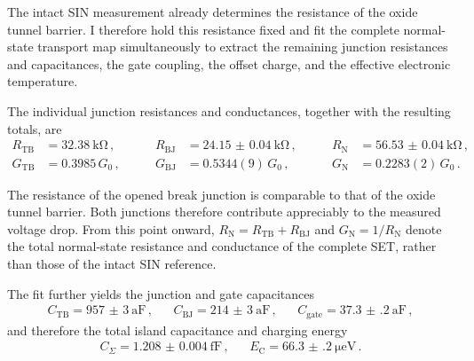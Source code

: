             The intact SIN measurement already determines the resistance of the oxide tunnel barrier. I therefore hold this resistance fixed and fit the complete normal-state transport map simultaneously to extract the remaining junction resistances and capacitances, the gate coupling, the offset charge, and the effective electronic temperature.
            
            The individual junction resistances and conductances, together with the resulting totals, are
            \begin{equation}
                \begin{alignedat}{3}
                    R_\mathrm{TB} &= \qty{32.38}{\kilo\ohm}\,, &\qquad
                    R_\mathrm{BJ} &= \qty{24.15(4)}{\kilo\ohm}\,, &\qquad
                    R_\mathrm{N}  &= \qty{56.53(4)}{\kilo\ohm}\,, \\
                    G_\mathrm{TB} &= 0.3985\,G_0\,, &\qquad
                    G_\mathrm{BJ} &= 0.5344(9)\,G_0\,, &\qquad
                    G_\mathrm{N}  &= 0.2283(2)\,G_0\,. 
                \end{alignedat}
                \label{eq:ssn-set:static:nset-resistance}
            \end{equation}

            The resistance of the opened break junction is comparable to that of the oxide tunnel barrier. Both junctions therefore contribute appreciably to the measured voltage drop. From this point onward, $R_\mathrm{N}=R_\mathrm{TB}+R_\mathrm{BJ}$ and $G_\mathrm{N}=1/R_\mathrm{N}$ denote the total normal-state resistance and conductance of the complete SET, rather than those of the intact SIN reference.

            The fit further yields the junction and gate capacitances
            \begin{align}
                C_\mathrm{TB} = \qty{957(3)}{\atto\farad}\,, &&
                C_\mathrm{BJ} = \qty{214(3)}{\atto\farad}\,, &&
                C_\mathrm{gate} = \qty{37.3(2)}{\atto\farad}\,,
                \label{eq:ssn-set:static:nset-capacitances}
            \end{align}
            and therefore the total island capacitance and charging energy
            \begin{align}
                C_\Sigma = \qty{1.208(4)}{\femto\farad}\,, &&
                E_\mathrm{C} = \qty{66.3(2)}{\micro\electronvolt}\,.
                \label{eq:ssn-set:static:nset-charging-energy}
            \end{align}

